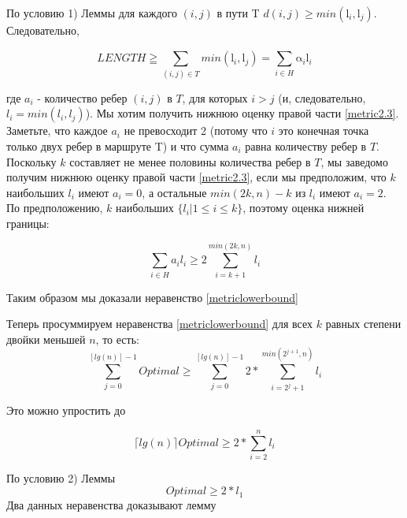 \documentclass[a4paper, 14pt]{extarticle}
\begin{document}
По условию 1) Леммы для каждого $(i, j)$ в пути T  $d (i, j)\geq min (\mathrm{l}_i, \mathrm{l}_j)$. Следовательно,

\begin{equation}\label{metric2.3}
	{LENGTH} \geqq \sum_{(i,j)\in T}^{}min(\mathrm{l}_i,\mathrm{l}_j ) = \sum_{i\in H}^{} \mathrm{\alpha}_i\mathrm{l}_i
\end{equation}

где $a_i$ - количество ребер $(i, j)$ в $T$, для которых $i > j$ (и, следовательно, $l_i=min(l_i, l_j)$).
Мы хотим получить нижнюю оценку правой части \eqref{metric2.3}. Заметьте, что каждое $a_i$ не превосходит 2 (потому что $i$ это конечная точка только двух ребер в маршруте T) и что сумма $a_i$ равна количеству ребер в $T$. Поскольку $k$ составляет не менее половины количества ребер в $T$, мы заведомо получим нижнюю оценку правой части \eqref{metric2.3}, если мы предположим, что $k$ наибольших $l_i$ имеют $a_i=0$, а остальные $min (2k, n) - k$ из $l_i$ имеют $a_i= 2$. По предположению, $k$ наибольших $\{ l_i|1 \leq i \leq k\}$, поэтому оценка нижней границы:


\begin{equation}
	\sum_{i \in H} a_i l_i \geq 2 \sum_{i=k+1}^{min(2k, n)} l_i
	\label{sum}
\end{equation}

Таким образом мы доказали неравенство \eqref{metriclowerbound}

Теперь просуммируем неравенства \eqref{metriclowerbound} для всех $k$ равных степени двойки меньшей $n$, то есть:
\begin{equation}
\sum_{j=0}^{[lg(n)]-1} Optimal \geq \sum_{j=0}^{[lg(n)]-1} 2* \sum_{i=2^j+1}^{min(2^{j+1}, n)} l_i
\end{equation}

Это можно упростить до

\begin{equation}
\lceil lg(n) \rceil Optimal \geq 2* \sum_{i=2}^{n} l_i
\end{equation}

По условию 2) Леммы
\begin{equation}
Optimal \geq 2*l_1
\end{equation}
Два данных неравенства доказывают лемму
\end{document}
